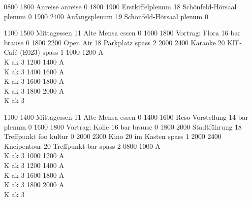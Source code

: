 \documentclass[a5paper,9pt]{scrreprt}
\begin{document}
\begin{timetable}
   {0800} {1800} {Anreise} {} {} {} {anreise}  {0}
   {1800} {1900} {Erstkiffelplenum} {18} {Schönfeld-Hörsaal} {} {plenum}  {0}
   {1900} {2400} {Anfangsplenum}    {19} {Schönfeld-Hörsaal} {} {plenum}  {0}

   {1100} {1500} {Mittagessen}      {11} {Alte Mensa}        {} {essen}   {0}
   {1600} {1800} {Vortrag: Flora}   {16} {bar}               {} {brause}  {0}
   {1800} {2200} {Open Air}         {18} {Parkplatz}         {} {spass}   {2}
   {2000} {2400} {Karaoke}          {20} {KIF-Café (E023)}   {} {spass}   {1}
   {1000} {1200} {\hfill A\\ \hfill K} {} {}               {} {ak}      {3}
   {1200} {1400} {\hfill A\\ \hfill K} {} {}               {} {ak}      {3}
   {1400} {1600} {\hfill A\\ \hfill K} {} {}               {} {ak}      {3}
   {1600} {1800} {\hfill A\\ \hfill K} {} {}               {} {ak}      {3}
   {1800} {2000} {\hfill A\\ \hfill K} {} {}               {} {ak}      {3}
  
   {1100} {1400} {Mittagessen}      {11} {Alte Mensa}        {} {essen}   {0}
   {1400} {1600} {Reso Vorstellung} {14} {bar}               {} {plenum}  {0}
   {1600} {1800} {Vortrag: Kolle}   {16} {bar}               {} {brause}  {0}
   {1800} {2000} {Stadtführung}     {18} {Treffpunkt foo}    {} {kultur}  {0}
   {2000} {2300} {Kino}             {20} {im Kasten}         {} {spass}   {1}
   {2000} {2400} {Kneipentour}      {20} {Treffpunkt bar}    {} {spass}   {2}
   {0800} {1000} {\hfill A\\ \hfill K} {} {}               {} {ak}      {3}
   {1000} {1200} {\hfill A\\ \hfill K} {} {}               {} {ak}      {3}
   {1200} {1400} {\hfill A\\ \hfill K} {} {}               {} {ak}      {3}
   {1600} {1800} {\hfill A\\ \hfill K} {} {}               {} {ak}      {3}
   {1800} {2000} {\hfill A\\ \hfill K} {} {}               {} {ak}      {3}


\end{timetable}
\end{document}
